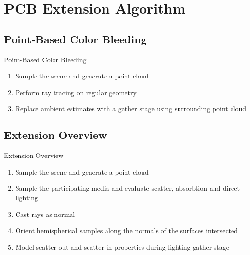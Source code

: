 \documentclass[10pt,compress,professionalfont]{beamer}
\begin{document}
\section{PCB Extension Algorithm}
\subsection{Point-Based Color Bleeding}
\begin{frame}{Point-Based Color Bleeding}

    \begin{enumerate}
        \item Sample the scene and generate a point cloud
        \item Perform ray tracing on regular geometry
        \item Replace ambient estimates with a gather stage using surrounding point cloud
    \end{enumerate}

\end{frame}




\subsection{Extension Overview}
\begin{frame}{Extension Overview}

    \begin{enumerate}
        \item Sample the scene and generate a point cloud
        \item Sample the participating media and evaluate scatter, absorbtion and direct lighting
        \item Cast rays as normal
        \item Orient hemispherical samples along the normals of the surfaces intersected
        \item Model scatter-out and scatter-in properties during lighting gather stage
    \end{enumerate}

\end{frame}
\end{document}
